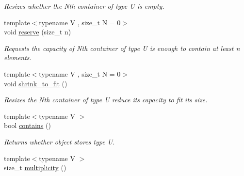 \begin{DoxyCompactItemize}
\begin{DoxyCompactList}\small\item\em Resizes whether the Nth container of type U is empty. \end{DoxyCompactList}\item 
\hypertarget{classheterogeneous_1_1heterovector_3_01_t_01_4_ab602c366ddbffdf334c157e4d28d2a74}{}{\footnotesize template$<$typename V , size\+\_\+t N = 0$>$ }\\void \hyperlink{classheterogeneous_1_1heterovector_3_01_t_01_4_ab602c366ddbffdf334c157e4d28d2a74}{reserve} (size\+\_\+t n)\label{classheterogeneous_1_1heterovector_3_01_t_01_4_ab602c366ddbffdf334c157e4d28d2a74}

\begin{DoxyCompactList}\small\item\em Requests the capacity of Nth container of type U is enough to contain at least n elements. \end{DoxyCompactList}\item 
\hypertarget{classheterogeneous_1_1heterovector_3_01_t_01_4_a108ed34e0099b3264a09a571e33fba36}{}{\footnotesize template$<$typename V , size\+\_\+t N = 0$>$ }\\void \hyperlink{classheterogeneous_1_1heterovector_3_01_t_01_4_a108ed34e0099b3264a09a571e33fba36}{shrink\+\_\+to\+\_\+fit} ()\label{classheterogeneous_1_1heterovector_3_01_t_01_4_a108ed34e0099b3264a09a571e33fba36}

\begin{DoxyCompactList}\small\item\em Resizes the Nth container of type U reduce its capacity to fit its size. \end{DoxyCompactList}\item 
\hypertarget{classheterogeneous_1_1heterovector_3_01_t_01_4_ad99416036749d437e820dc25590846f4}{}{\footnotesize template$<$typename V $>$ }\\bool \hyperlink{classheterogeneous_1_1heterovector_3_01_t_01_4_ad99416036749d437e820dc25590846f4}{contains} ()\label{classheterogeneous_1_1heterovector_3_01_t_01_4_ad99416036749d437e820dc25590846f4}

\begin{DoxyCompactList}\small\item\em Returns whether object stores type U. \end{DoxyCompactList}\item 
\hypertarget{classheterogeneous_1_1heterovector_3_01_t_01_4_abb94fb96a73238a7cef3e4705fd47f65}{}{\footnotesize template$<$typename V $>$ }\\size\+\_\+t \hyperlink{classheterogeneous_1_1heterovector_3_01_t_01_4_abb94fb96a73238a7cef3e4705fd47f65}{multiplicity} ()\label{classheterogeneous_1_1heterovector_3_01_t_01_4_abb94fb96a73238a7cef3e4705fd47f65}


\end{DoxyCompactItemize}
